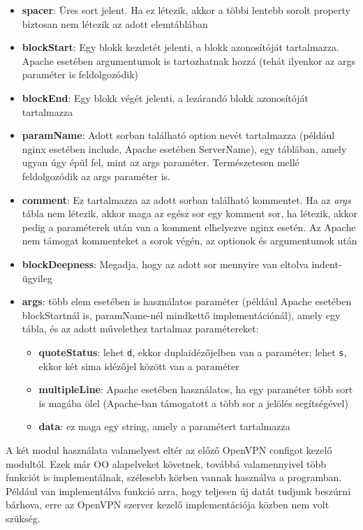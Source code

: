 \begin{itemize}
	\item \textbf{spacer}: Üres sort jelent. Ha ez létezik, akkor a többi lentebb sorolt property biztosan nem létezik az adott elemtáblában
	\item \textbf{blockStart}: Egy blokk kezdetét jelenti, a blokk azonosítóját tartalmazza. Apache esetében argumentumok is tartozhatnak hozzá (tehát ilyenkor az args paraméter is feldolgozódik)
	\item \textbf{blockEnd}: Egy blokk végét jelenti, a lezárandó blokk azonosítóját tartalmazza
	\item \textbf{paramName}: Adott sorban található option nevét tartalmazza (például nginx esetében include, Apache esetében ServerName), egy táblában, amely ugyan úgy épül fel, mint az args paraméter. Természetesen mellé feldolgozódik az args paraméter is.
	\item \textbf{comment}: Ez tartalmazza az adott sorban található kommentet. Ha az \textit{args} tábla nem létezik, akkor maga az egész sor egy komment sor, ha létezik, akkor pedig a paraméterek után van a komment elhelyezve nginx esetén. Az Apache nem támogat kommenteket a sorok végén, az optionok és argumentumok után
	\item \textbf{blockDeepness}: Megadja, hogy az adott sor mennyire van eltolva indent-ügyileg
	\item \textbf{args}: több elem esetében is használatos paraméter (például Apache esetében blockStartnál is, paramName-nél mindkettő implementációnál), amely egy tábla, és az adott művelethez tartalmaz paramétereket:
		\begin{itemize}
			\item \textbf{quoteStatus}: lehet \texttt{d}, ekkor duplaidézőjelben van a paraméter; lehet \texttt{s}, ekkor két sima idézőjel között van a paraméter
			\item \textbf{multipleLine}: Apache esetében használatos, ha egy paraméter több sort is magába ölel (Apache-ban támogatott a több sor a \texttt{\detokenize{\\}} jelölés segítségével)
			\item \textbf{data}: ez maga egy string, amely a paramétert tartalmazza
		\end{itemize}
\end{itemize}

A két modul használata valamelyest eltér az előző OpenVPN configot kezelő modultól. Ezek már OO alapelveket követnek, továbbá valamennyivel több funkciót is implementálnak, szélesebb körben vannak használva a programban. Például van implementálva funkció arra, hogy teljesen új datát tudjunk beszúrni bárhova, erre az OpenVPN szerver kezelő implementációja közben nem volt szükség.

